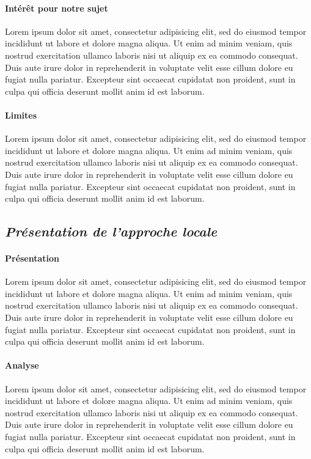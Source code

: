 \documentclass[11pt, french]{report-rd-info}
\begin{document}
\paragraph{Intérêt pour notre sujet }
Lorem ipsum dolor sit amet, consectetur adipisicing elit, sed do eiusmod tempor incididunt ut labore et dolore magna aliqua. Ut enim ad minim veniam, quis nostrud exercitation ullamco laboris nisi ut aliquip ex ea commodo consequat. Duis aute irure dolor in reprehenderit in voluptate velit esse cillum dolore eu fugiat nulla pariatur. Excepteur sint occaecat cupidatat non proident, sunt in culpa qui officia deserunt mollit anim id est laborum.

\paragraph{Limites }
Lorem ipsum dolor sit amet, consectetur adipisicing elit, sed do eiusmod tempor incididunt ut labore et dolore magna aliqua. Ut enim ad minim veniam, quis nostrud exercitation ullamco laboris nisi ut aliquip ex ea commodo consequat. Duis aute irure dolor in reprehenderit in voluptate velit esse cillum dolore eu fugiat nulla pariatur. Excepteur sint occaecat cupidatat non proident, sunt in culpa qui officia deserunt mollit anim id est laborum.

\subsection{\emph{Présentation de l’approche locale}}

\paragraph{Présentation }
Lorem ipsum dolor sit amet, consectetur adipisicing elit, sed do eiusmod tempor incididunt ut labore et dolore magna aliqua. Ut enim ad minim veniam, quis nostrud exercitation ullamco laboris nisi ut aliquip ex ea commodo consequat. Duis aute irure dolor in reprehenderit in voluptate velit esse cillum dolore eu fugiat nulla pariatur. Excepteur sint occaecat cupidatat non proident, sunt in culpa qui officia deserunt mollit anim id est laborum.

\paragraph{Analyse }
Lorem ipsum dolor sit amet, consectetur adipisicing elit, sed do eiusmod tempor incididunt ut labore et dolore magna aliqua. Ut enim ad minim veniam, quis nostrud exercitation ullamco laboris nisi ut aliquip ex ea commodo consequat. Duis aute irure dolor in reprehenderit in voluptate velit esse cillum dolore eu fugiat nulla pariatur. Excepteur sint occaecat cupidatat non proident, sunt in culpa qui officia deserunt mollit anim id est laborum.
\end{document}
